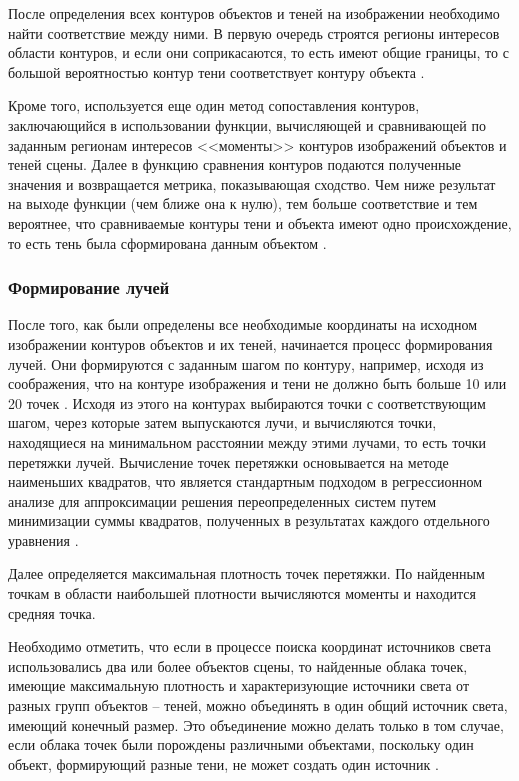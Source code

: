 После определения всех контуров объектов и теней на изображении необходимо найти соответствие между ними. В первую очередь строятся регионы интересов \cite{roi} области контуров, и если они соприкасаются, то есть имеют общие границы, то с большой вероятностью контур тени соответствует контуру объекта \cite{sns_tras}.

Кроме того, используется еще один метод сопоставления контуров, заключающийся в использовании функции, вычисляющей и сравнивающей по заданным регионам интересов <<моменты>> контуров изображений объектов и теней сцены. Далее в функцию сравнения контуров подаются полученные значения и возвращается метрика, показывающая сходство. Чем ниже результат на выходе функции (чем ближе она к нулю), тем больше соответствие и тем вероятнее, что сравниваемые контуры тени и объекта имеют одно происхождение, то есть тень была сформирована данным объектом \cite{sns_tras}.

\subsubsection*{Формирование лучей}

После того, как были определены все необходимые координаты на исходном изображении контуров объектов и их теней, начинается процесс формирования лучей. Они формируются с заданным шагом по контуру, например, исходя из соображения, что на контуре изображения и тени не должно быть больше 10 или 20 точек \cite{sns_tras}. Исходя из этого на контурах выбираются точки с соответствующим шагом, через которые затем выпускаются лучи, и вычисляются точки, находящиеся на минимальном расстоянии между этими лучами, то есть точки перетяжки лучей. Вычисление точек перетяжки основывается на методе наименьших квадратов, что является стандартным подходом в регрессионном анализе для аппроксимации решения переопределенных систем путем минимизации суммы квадратов, полученных в результатах каждого отдельного уравнения \cite{mnk}.

Далее определяется максимальная плотность точек перетяжки. По найденным точкам в области наибольшей плотности вычисляются моменты и находится средняя точка.

Необходимо отметить, что если в процессе поиска координат источников света использовались два или более объектов сцены, то найденные облака точек, имеющие максимальную плотность и характеризующие источники света от разных групп объектов – теней, можно объединять в один общий источник света, имеющий конечный размер. Это объединение можно делать только в том случае, если облака точек были порождены различными объектами, поскольку один объект, формирующий разные тени, не может создать один источник \cite{sns_tras}.

